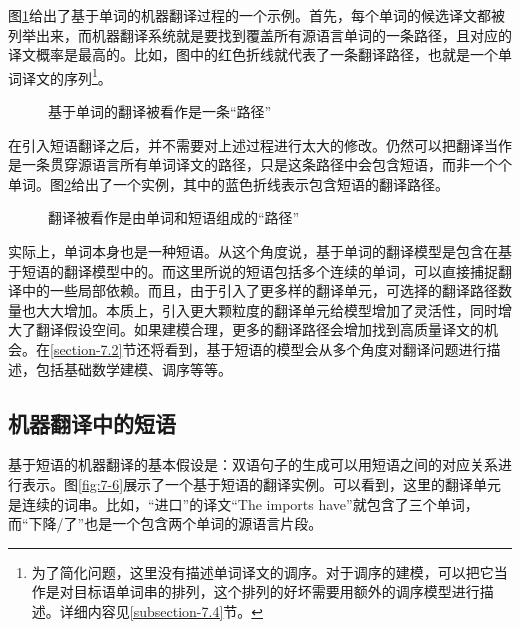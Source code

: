 \parinterval 图\ref{fig:7-4}给出了基于单词的机器翻译过程的一个示例。首先，每个单词的候选译文都被列举出来，而机器翻译系统就是要找到覆盖所有源语言单词的一条路径，且对应的译文概率是最高的。比如，图中的红色折线就代表了一条翻译路径，也就是一个单词译文的序列\footnote[1]{为了简化问题，这里没有描述单词译文的调序。对于调序的建模，可以把它当作是对目标语单词串的排列，这个排列的好坏需要用额外的调序模型进行描述。详细内容见\ref{subsection-7.4}节。}。

\begin{figure}[htp]
\centering

\caption{基于单词的翻译被看作是一条“路径”}
\label{fig:7-4}
\end{figure}

\parinterval 在引入短语翻译之后，并不需要对上述过程进行太大的修改。仍然可以把翻译当作是一条贯穿源语言所有单词译文的路径，只是这条路径中会包含短语，而非一个个单词。图\ref{fig:7-5}给出了一个实例，其中的蓝色折线表示包含短语的翻译路径。

\begin{figure}[htp]
\centering

\caption{翻译被看作是由单词和短语组成的“路径”}
\label{fig:7-5}
\end{figure}

\parinterval 实际上，单词本身也是一种短语。从这个角度说，基于单词的翻译模型是包含在基于短语的翻译模型中的。而这里所说的短语包括多个连续的单词，可以直接捕捉翻译中的一些局部依赖。而且，由于引入了更多样的翻译单元，可选择的翻译路径数量也大大增加。本质上，引入更大颗粒度的翻译单元给模型增加了灵活性，同时增大了翻译假设空间。如果建模合理，更多的翻译路径会增加找到高质量译文的机会。在\ref{section-7.2}节还将看到，基于短语的模型会从多个角度对翻译问题进行描述，包括基础数学建模、调序等等。


\subsection{机器翻译中的短语}

\parinterval 基于短语的机器翻译的基本假设是：双语句子的生成可以用短语之间的对应关系进行表示。图\ref{fig:7-6}展示了一个基于短语的翻译实例。可以看到，这里的翻译单元是连续的词串。比如，“进口”的译文“The imports have”就包含了三个单词，而“下降/了”也是一个包含两个单词的源语言片段。

